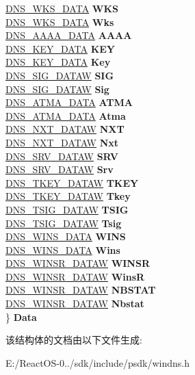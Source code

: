 \begin{DoxyCompactItemize}
\begin{tabbing}
\>\hyperlink{struct_d_n_s___w_k_s___d_a_t_a}{DNS\_WKS\_DATA} {\bfseries WKS}\\
\>\hyperlink{struct_d_n_s___w_k_s___d_a_t_a}{DNS\_WKS\_DATA} {\bfseries Wks}\\
\>\hyperlink{struct_d_n_s___a_a_a_a___d_a_t_a}{DNS\_AAAA\_DATA} {\bfseries AAAA}\\
\>\hyperlink{struct_d_n_s___k_e_y___d_a_t_a}{DNS\_KEY\_DATA} {\bfseries KEY}\\
\>\hyperlink{struct_d_n_s___k_e_y___d_a_t_a}{DNS\_KEY\_DATA} {\bfseries Key}\\
\>\hyperlink{struct_d_n_s___s_i_g___d_a_t_a_w}{DNS\_SIG\_DATAW} {\bfseries SIG}\\
\>\hyperlink{struct_d_n_s___s_i_g___d_a_t_a_w}{DNS\_SIG\_DATAW} {\bfseries Sig}\\
\>\hyperlink{struct_d_n_s___a_t_m_a___d_a_t_a}{DNS\_ATMA\_DATA} {\bfseries ATMA}\\
\>\hyperlink{struct_d_n_s___a_t_m_a___d_a_t_a}{DNS\_ATMA\_DATA} {\bfseries Atma}\\
\>\hyperlink{struct_d_n_s___n_x_t___d_a_t_a_w}{DNS\_NXT\_DATAW} {\bfseries NXT}\\
\>\hyperlink{struct_d_n_s___n_x_t___d_a_t_a_w}{DNS\_NXT\_DATAW} {\bfseries Nxt}\\
\>\hyperlink{struct_d_n_s___s_r_v___d_a_t_a_w}{DNS\_SRV\_DATAW} {\bfseries SRV}\\
\>\hyperlink{struct_d_n_s___s_r_v___d_a_t_a_w}{DNS\_SRV\_DATAW} {\bfseries Srv}\\
\>\hyperlink{struct_d_n_s___t_k_e_y___d_a_t_a_w}{DNS\_TKEY\_DATAW} {\bfseries TKEY}\\
\>\hyperlink{struct_d_n_s___t_k_e_y___d_a_t_a_w}{DNS\_TKEY\_DATAW} {\bfseries Tkey}\\
\>\hyperlink{struct_d_n_s___t_s_i_g___d_a_t_a_w}{DNS\_TSIG\_DATAW} {\bfseries TSIG}\\
\>\hyperlink{struct_d_n_s___t_s_i_g___d_a_t_a_w}{DNS\_TSIG\_DATAW} {\bfseries Tsig}\\
\>\hyperlink{struct_d_n_s___w_i_n_s___d_a_t_a}{DNS\_WINS\_DATA} {\bfseries WINS}\\
\>\hyperlink{struct_d_n_s___w_i_n_s___d_a_t_a}{DNS\_WINS\_DATA} {\bfseries Wins}\\
\>\hyperlink{struct_d_n_s___w_i_n_s_r___d_a_t_a_w}{DNS\_WINSR\_DATAW} {\bfseries WINSR}\\
\>\hyperlink{struct_d_n_s___w_i_n_s_r___d_a_t_a_w}{DNS\_WINSR\_DATAW} {\bfseries WinsR}\\
\>\hyperlink{struct_d_n_s___w_i_n_s_r___d_a_t_a_w}{DNS\_WINSR\_DATAW} {\bfseries NBSTAT}\\
\>\hyperlink{struct_d_n_s___w_i_n_s_r___d_a_t_a_w}{DNS\_WINSR\_DATAW} {\bfseries Nbstat}\\
\} {\bfseries Data}\\

\end{tabbing}\end{DoxyCompactItemize}


该结构体的文档由以下文件生成\+:\begin{DoxyCompactItemize}
\item 
E\+:/\+React\+O\+S-\/0../sdk/include/psdk/windns.\+h\end{DoxyCompactItemize}
